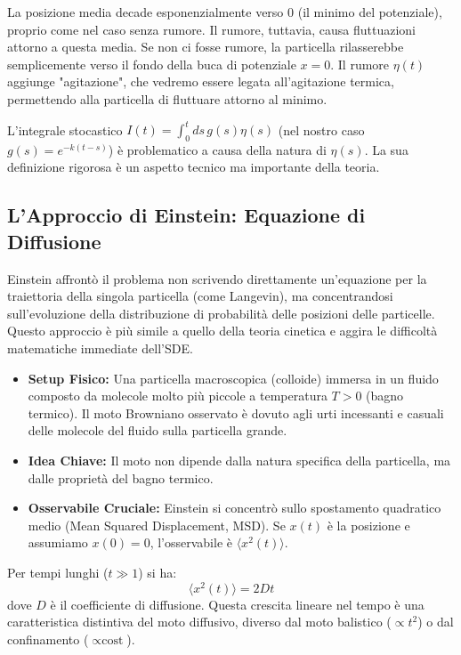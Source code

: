 La posizione media decade esponenzialmente verso $0$ (il minimo del potenziale), proprio come nel caso senza rumore. Il rumore, tuttavia, causa fluttuazioni attorno a questa media. Se non ci fosse rumore, la particella rilasserebbe semplicemente verso il fondo della buca di potenziale $x=0$. Il rumore $\eta(t)$ aggiunge "agitazione", che vedremo essere legata all'agitazione termica, permettendo alla particella di fluttuare attorno al minimo.

\begin{tcolorbox}[colback=colorF!5,colframe=colorF,title=\textbf{!! Attenzione !!}, fonttitle=\bfseries\sffamily, arc=3mm, boxrule=1.2pt]
L'integrale stocastico $I(t) = \int_0^t ds \, g(s) \eta(s)$ (nel nostro caso $g(s) = e^{-k(t-s)}$) è problematico a causa della natura di $\eta(s)$. La sua definizione rigorosa è un aspetto tecnico ma importante della teoria.
\end{tcolorbox}

\subsection{L'Approccio di Einstein: Equazione di Diffusione}
Einstein affrontò il problema non scrivendo direttamente un'equazione per la traiettoria della singola particella (come Langevin), ma concentrandosi sull'evoluzione della distribuzione di probabilità delle posizioni delle particelle. Questo approccio è più simile a quello della teoria cinetica e aggira le difficoltà matematiche immediate dell'SDE.

\begin{itemize}
    \item \textbf{Setup Fisico:} Una particella macroscopica (colloide) immersa in un fluido composto da molecole molto più piccole a temperatura $T > 0$ (bagno termico). Il moto Browniano osservato è dovuto agli urti incessanti e casuali delle molecole del fluido sulla particella grande.
    \item \textbf{Idea Chiave:} Il moto non dipende dalla natura specifica della particella, ma dalle proprietà del bagno termico.
    \item \textbf{Osservabile Cruciale:} Einstein si concentrò sullo spostamento quadratico medio (Mean Squared Displacement, MSD). Se $x(t)$ è la posizione e assumiamo $x(0)=0$, l'osservabile è $\langle x^2(t) \rangle$.
\end{itemize}

Per tempi lunghi ($t \gg 1$) si ha:
\begin{equation}
\langle x^2(t) \rangle = 2Dt
\end{equation}
dove $D$ è il coefficiente di diffusione. Questa crescita lineare nel tempo è una caratteristica distintiva del moto diffusivo, diverso dal moto balistico ($\propto t^2$) o dal confinamento ($\propto \text{cost}$).

